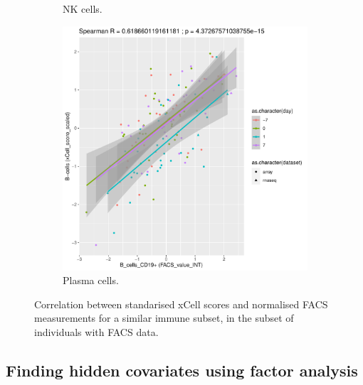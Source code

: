 \begin{figure}
\begin{subfigure}[b]{0.43\textwidth}
        \caption{\gls{NK} cells.}
    \end{subfigure}
    \bigskip\vfill
    \begin{subfigure}[b]{0.43\textwidth}
        \centering
        \includegraphics[width=1.0\textwidth,page=2]{mainmatter/figures/chapter_03/validate_xCell_estimates.cell_type_pairs.pdf}
        \caption{Plasma cells.}
    \end{subfigure}
    \caption{Correlation between standarised xCell scores and normalised \gls{FACS} measurements for a similar immune subset, in the subset of individuals with \gls{FACS} data.}
    \label{fig:hird_xCell_vs_FACS}
\end{figure}

\subsection{Finding hidden covariates using factor analysis}

%

